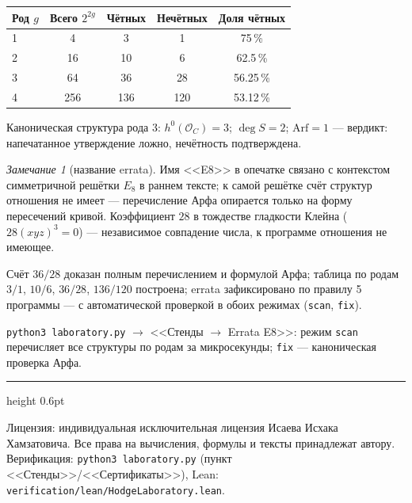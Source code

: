 \documentclass[11pt,a4paper]{article}
\theoremstyle{plain}
\theoremstyle{definition}
\theoremstyle{remark}
\newtheorem{remark}[theorem]{Замечание}
\begin{document}
\begin{databox}
\begin{center}
\begin{tabular}{@{}l c c c c@{}}
\toprule
Род $g$ & Всего $2^{2g}$ & Чётных & Нечётных & Доля чётных \\
\midrule
1 & 4   & 3   & 1   & 75\,\% \\
2 & 16  & 10  & 6   & 62.5\,\% \\
3 & 64  & 36  & 28  & 56.25\,\% \\
4 & 256 & 136 & 120 & 53.12\,\% \\
\bottomrule
\end{tabular}
\end{center}
Каноническая структура рода 3: $h^0(\mathcal O_C)=3$; $\deg S=2$;
$\mathrm{Arf}=1$ --- вердикт: напечатанное утверждение ложно,
нечётность подтверждена.
\end{databox}

\begin{remark}[название errata]
Имя <<E8>> в опечатке связано с контекстом симметричной решётки
$E_8$ в раннем тексте; к самой решётке счёт структур отношения не
имеет --- перечисление Арфа опирается только на форму пересечений
кривой. Коэффициент $28$ в тождестве гладкости Клейна
($28(xyz)^3=0$) --- независимое совпадение числа, к программе
отношения не имеющее.
\end{remark}

\begin{statusbox}[итог]
Счёт $36/28$ доказан полным перечислением и формулой Арфа; таблица по родам $3/1$, $10/6$, $36/28$, $136/120$ построена; errata зафиксировано
по правилу 5 программы --- с автоматической проверкой в обоих
режимах (\texttt{scan}, \texttt{fix}).
\end{statusbox}

\begin{verifybox}
\texttt{python3 laboratory.py} $\to$ <<Стенды $\to$ Errata E8>>:
режим \texttt{scan} перечисляет все структуры по родам за
микросекунды; \texttt{fix} --- каноническая проверка Арфа.
\end{verifybox}

\vfill
{\color{linkblue}\hrule height 0.6pt}
\vspace{0.5em}
{\small\color{gray}
Лицензия: индивидуальная исключительная лицензия Исаева Исхака Хамзатовича.
Все права на вычисления, формулы и тексты принадлежат автору.
Верификация: \texttt{python3 laboratory.py} (пункт <<Стенды>>/<<Сертификаты>>),
Lean: \texttt{verification/lean/HodgeLaboratory.lean}.
}
\end{document}
